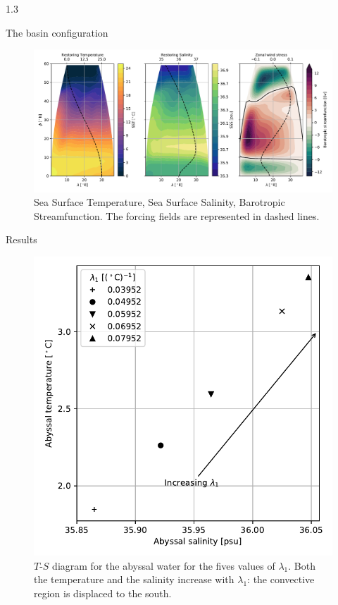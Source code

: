 \documentclass[final]{beamer}
\newlength{\colwidth}
\begin{document}
\begin{frame}[t]
\begin{columns}[t]
\begin{column}{1.3\colwidth}
\begin{block}{The basin configuration}
{\begin{minipage}{.62\textwidth}
        \begin{figure}
        \centering
        \includegraphics[width=\textwidth]{surf}
        \caption{Sea Surface Temperature, Sea Surface Salinity, Barotropic
          Streamfunction. The forcing fields are represented in dashed lines.}
      \end{figure}
    \end{minipage}}
  
  \end{block}


  
  \begin{alertblock}{Results}
    \begin{minipage}{.35\textwidth}
      \begin{figure}
        \includegraphics[width=5in]{abyssal}
        \caption{$T$-$S$ diagram for the abyssal water for the fives values of $\lambda_1$.
          Both the temperature and the salinity increase with $\lambda_1$:
          the convective region is displaced to the south.}
      \end{figure}


\end{minipage}
\end{alertblock}
\end{column}
\end{columns}
\end{frame}
\end{document}
